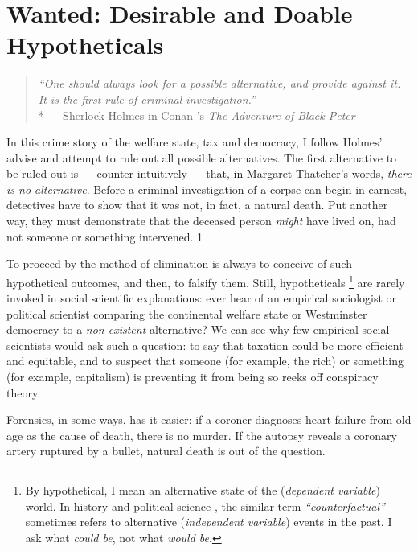 
\chapter[Wanted]{Wanted: Desirable and Doable Hypotheticals} \label{chap:wanted}

\begin{quote}
	\emph{``One should always look for a possible alternative, and provide against it. It is the first rule of criminal investigation.''}\\*
	--- Sherlock Holmes in Conan \citeauthor{Doyle1904}'s \emph{The Adventure of Black Peter} \citeyearpar[567]{Doyle1904}
\end{quote}

In this crime story of the welfare state, tax and democracy, I follow Holmes' advise and attempt to rule out all possible alternatives. 
The first alternative to be ruled out is --- counter-intuitively --- that, in Margaret Thatcher's words, \emph{there is no alternative}. 
Before a criminal investigation of a corpse can begin in earnest, detectives have to show that it was not, in fact, a natural death. 
Put another way, they must demonstrate that the deceased person \emph{might} have lived on, had not someone or something intervened. 1

To proceed by the method of elimination is always to conceive of such hypothetical outcomes, and then, to falsify them. Still, hypotheticals
\footnote{
	By hypothetical, I mean an alternative state of the (\emph{dependent variable}) world. 
	In history \citep[recently reviewed by][]{Bunzl2004} and political science \citep[for a methodological appraisal, see][]{Fearon1991}, the similar term \emph{``counterfactual''} sometimes refers to alternative (\emph{independent variable}) events in the past. I ask what \emph{could be}, not what \emph{would be}.
}
are rarely invoked in social scientific explanations: ever hear of an empirical sociologist or political scientist comparing the continental welfare state \citep{Esping-Andersen-1990-aa} or Westminster democracy \citep{Lijphart-1999-aa} to a \emph{non-existent} alternative? 
We can see why few empirical social scientists would ask such a question: to say that taxation could be more efficient and equitable, and to suspect that someone (for example, the rich) or something (for example, capitalism) is preventing it from being so reeks off conspiracy theory. 

Forensics, in some ways, has it easier: if a coroner diagnoses heart failure from old age as the cause of death, there is no murder. 
If the autopsy reveals a coronary artery ruptured by a bullet, natural death is out of the question.

